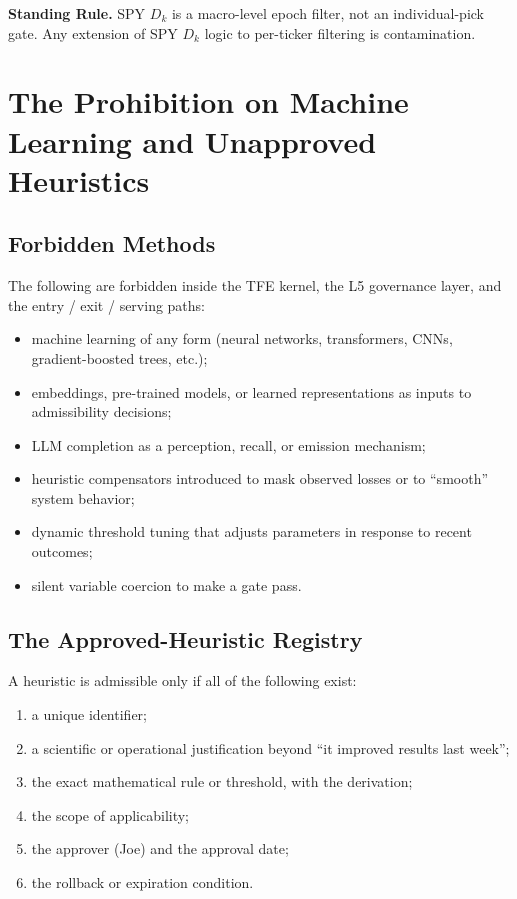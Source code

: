 \documentclass[11pt, a4paper]{article}
\newcommand{\rulebox}[1]{%
  \begin{framed}\noindent\textbf{Standing Rule.} #1\end{framed}}
\theoremstyle{definition}
\begin{document}
\rulebox{SPY $D_k$ is a macro-level epoch filter, not an individual-pick gate.
Any extension of SPY $D_k$ logic to per-ticker filtering is contamination.}

\section{The Prohibition on Machine Learning and Unapproved Heuristics}

\subsection{Forbidden Methods}

The following are forbidden inside the TFE kernel, the L5 governance layer,
and the entry / exit / serving paths:

\begin{itemize}
\item machine learning of any form (neural networks, transformers, CNNs,
gradient-boosted trees, etc.);
\item embeddings, pre-trained models, or learned representations as inputs to
admissibility decisions;
\item LLM completion as a perception, recall, or emission mechanism;
\item heuristic compensators introduced to mask observed losses or to
``smooth'' system behavior;
\item dynamic threshold tuning that adjusts parameters in response to recent
outcomes;
\item silent variable coercion to make a gate pass.
\end{itemize}

\subsection{The Approved-Heuristic Registry}

A heuristic is admissible only if all of the following exist:

\begin{enumerate}[leftmargin=1.2cm]
\item a unique identifier;
\item a scientific or operational justification beyond ``it improved results
last week'';
\item the exact mathematical rule or threshold, with the derivation;
\item the scope of applicability;
\item the approver (Joe) and the approval date;
\item the rollback or expiration condition.
\end{enumerate}
\end{document}
